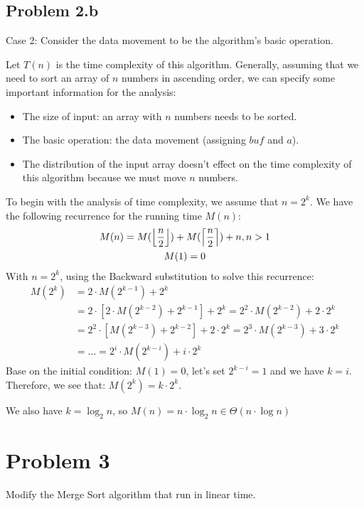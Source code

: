 \documentclass[a4paper]{article}
\DeclarePairedDelimiter\ceil{\lceil}{\rceil}
\DeclarePairedDelimiter\floor{\lfloor}{\rfloor}
\begin{document}
\subsection{Problem 2.b}
Case 2: Consider the data movement to be the algorithm's basic operation. \par \bigskip
Let $T(n)$ is the time complexity of this algorithm. Generally, assuming that we need to sort an array of $n$ numbers in ascending order, we can specify some important information for the analysis:
\begin{itemize}
    \item The size of input: an array with $n$ numbers needs to be sorted.
    \item The basic operation: the data movement (assigning $buf$ and $a$).
    \item The distribution of the input array doesn't effect on the time complexity of this algorithm because we must move $n$ numbers.
\end{itemize}
To begin with the analysis of time complexity, we assume that $n = 2^k$. We have the following recurrence for the running time $M(n)$: 
\begin{gather*}
     M(n) = M(\floor* {\frac{n}{2}}) + M(\ceil* {\frac{n}{2}}) + n, n > 1 \\ 
                M(1) = 0
\end{gather*}
With $n = 2^k$, using the Backward substitution to solve this recurrence:
\begin{equation*}
    \begin{aligned}
      M(2^k) & = 2 \cdot M(2^{k-1}) + 2^{k}\\ 
             & = 2 \cdot [2 \cdot M(2^{k-2}) + 2^{k-1}] + 2^{k}= 2^2 \cdot M(2^{k-2}) + 2\cdot2^k\\ 
             & = 2^2\cdot[M(2^{k-3})+2^{k-2}]+2\cdot2^k= 2^3\cdot M(2^{k-3}) + 3 \cdot 2^{k}\\ 
             & = \ldots = 2^i \cdot M(2^{k-i}) + i \cdot 2^k
    \end{aligned}
\end{equation*}
Base on the initial condition: $M(1) = 0$, let's set $2^{k-i} = 1$ and we have $k=i$. Therefore, we see that: $M(2^k) = k \cdot 2^k$. \par \bigskip
We also have $k = \log_2 n$, so $M(n) = n \cdot \log_2n \in \Theta(n \cdot \log n)$
\newpage
\section{Problem 3}
Modify the Merge Sort algorithm that run in linear time.
\end{document}
